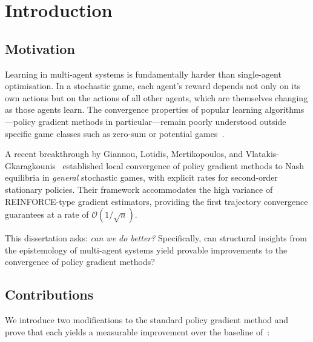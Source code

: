 \chapter{Introduction}
\label{ch:introduction}

\section{Motivation}

Learning in multi-agent systems is fundamentally harder than single-agent optimisation. In a stochastic game, each agent's reward depends not only on its own actions but on the actions of all other agents, which are themselves changing as those agents learn. The convergence properties of popular learning algorithms---policy gradient methods in particular---remain poorly understood outside specific game classes such as zero-sum or potential games~\cite{giannou2022}.

A recent breakthrough by Giannou, Lotidis, Mertikopoulos, and Vlatakis-Gkaragkounis~\cite{giannou2022} established local convergence of policy gradient methods to Nash equilibria in \emph{general} stochastic games, with explicit rates for second-order stationary policies. Their framework accommodates the high variance of REINFORCE-type gradient estimators, providing the first trajectory convergence guarantees at a rate of $\mathcal{O}(1/\sqrt{n})$.

This dissertation asks: \emph{can we do better?} Specifically, can structural insights from the epistemology of multi-agent systems yield provable improvements to the convergence of policy gradient methods?

\section{Contributions}

We introduce two modifications to the standard policy gradient method and prove that each yields a measurable improvement over the baseline of~\cite{giannou2022}:

